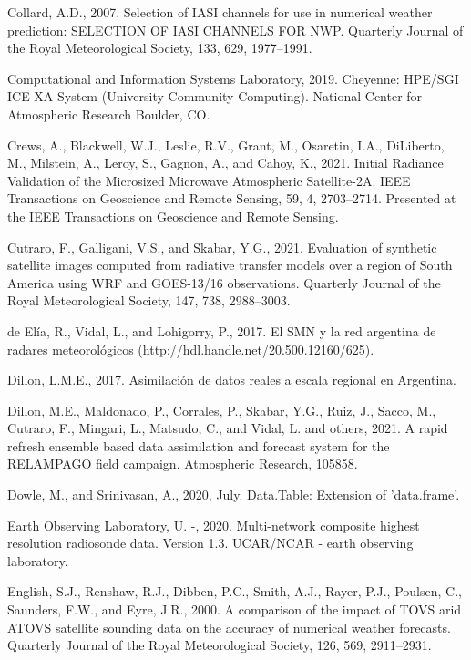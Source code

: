 \documentclass[12pt,oneside,a4paper]{reedthesis}
\begin{document}
\leavevmode\hypertarget{ref-collard2007}{}%
Collard, A.D., 2007. Selection of IASI channels for use in numerical weather prediction: SELECTION OF IASI CHANNELS FOR NWP. Quarterly Journal of the Royal Meteorological Society, 133, 629, 1977--1991.

\leavevmode\hypertarget{ref-Cheyenne2019}{}%
Computational and Information Systems Laboratory, 2019. Cheyenne: HPE/SGI ICE XA System (University Community Computing). National Center for Atmospheric Research Boulder, CO.

\leavevmode\hypertarget{ref-crews2021}{}%
Crews, A., Blackwell, W.J., Leslie, R.V., Grant, M., Osaretin, I.A., DiLiberto, M., Milstein, A., Leroy, S., Gagnon, A., and Cahoy, K., 2021. Initial Radiance Validation of the Microsized Microwave Atmospheric Satellite-2A. IEEE Transactions on Geoscience and Remote Sensing, 59, 4, 2703--2714. Presented at the IEEE Transactions on Geoscience and Remote Sensing.

\leavevmode\hypertarget{ref-cutraro2021}{}%
Cutraro, F., Galligani, V.S., and Skabar, Y.G., 2021. Evaluation of synthetic satellite images computed from radiative transfer models over a region of South America using WRF and GOES-13/16 observations. Quarterly Journal of the Royal Meteorological Society, 147, 738, 2988--3003.

\leavevmode\hypertarget{ref-deelia2017}{}%
de Elía, R., Vidal, L., and Lohigorry, P., 2017. El SMN y la red argentina de radares meteorológicos (\url{http://hdl.handle.net/20.500.12160/625}).

\leavevmode\hypertarget{ref-dillon2017}{}%
Dillon, L.M.E., 2017. Asimilación de datos reales a escala regional en Argentina.

\leavevmode\hypertarget{ref-dillon2021}{}%
Dillon, M.E., Maldonado, P., Corrales, P., Skabar, Y.G., Ruiz, J., Sacco, M., Cutraro, F., Mingari, L., Matsudo, C., and Vidal, L. and others, 2021. A rapid refresh ensemble based data assimilation and forecast system for the RELAMPAGO field campaign. Atmospheric Research, 105858.

\leavevmode\hypertarget{ref-dowle2020}{}%
Dowle, M., and Srinivasan, A., 2020, July. Data.Table: Extension of 'data.frame'.

\leavevmode\hypertarget{ref-sondeos}{}%
Earth Observing Laboratory, U. -, 2020. Multi-network composite highest resolution radiosonde data. Version 1.3. UCAR/NCAR - earth observing laboratory.

\leavevmode\hypertarget{ref-english2000}{}%
English, S.J., Renshaw, R.J., Dibben, P.C., Smith, A.J., Rayer, P.J., Poulsen, C., Saunders, F.W., and Eyre, J.R., 2000. A comparison of the impact of TOVS arid ATOVS satellite sounding data on the accuracy of numerical weather forecasts. Quarterly Journal of the Royal Meteorological Society, 126, 569, 2911--2931.
\end{document}

